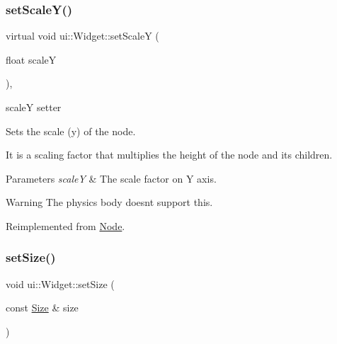 \mbox{\label{classui_1_1Widget_a8d68ee46f555dc23b8fcec84542eadcc}} 
\subsubsection{\texorpdfstring{set\+Scale\+Y()}{setScaleY()}\hspace{0.1cm}{\footnotesize\ttfamily [2/2]}}
{\footnotesize\ttfamily virtual void ui\+::\+Widget\+::set\+ScaleY (\begin{DoxyParamCaption}\item[{float}]{scaleY }\end{DoxyParamCaption})\hspace{0.3cm}{\ttfamily [override]}, {\ttfamily [virtual]}}



scaleY setter 

Sets the scale (y) of the node.

It is a scaling factor that multiplies the height of the node and its children.


\begin{DoxyParams}{Parameters}
{\em scaleY} & The scale factor on Y axis.\\
\hline
\end{DoxyParams}
\begin{DoxyWarning}{Warning}
The physics body doesn\textquotesingle{}t support this. 
\end{DoxyWarning}


Reimplemented from \hyperlink{classNode_aec805a1fa9e8e1038556e468138bb804}{Node}.

\mbox{\label{classui_1_1Widget_abdbcc81799b57a3124812fe0ec1929cf}} 
\subsubsection{\texorpdfstring{set\+Size()}{setSize()}\hspace{0.1cm}{\footnotesize\ttfamily [1/2]}}
{\footnotesize\ttfamily void ui\+::\+Widget\+::set\+Size (\begin{DoxyParamCaption}\item[{const \hyperlink{classSize}{Size} \&}]{size }\end{DoxyParamCaption})\hspace{0.3cm}{\ttfamily [virtual]}}

